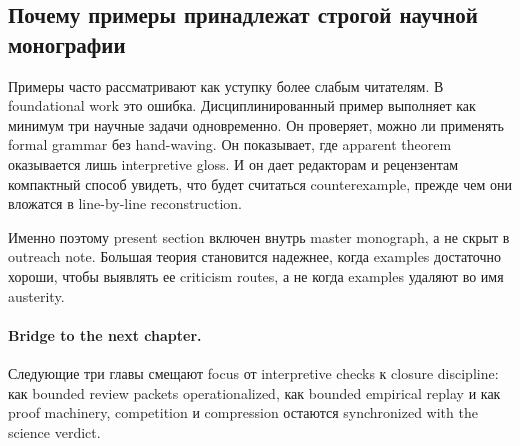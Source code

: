 \subsection{Почему примеры принадлежат строгой научной монографии}

Примеры часто рассматривают как уступку более слабым читателям. В
foundational work это ошибка. Дисциплинированный пример выполняет как
минимум три научные задачи одновременно. Он проверяет, можно ли применять
formal grammar без hand-waving. Он показывает, где apparent theorem
оказывается лишь interpretive gloss. И он дает редакторам и рецензентам
компактный способ увидеть, что будет считаться counterexample, прежде чем
они вложатся в line-by-line reconstruction.

Именно поэтому present section включен внутрь master monograph, а не скрыт в
outreach note. Большая теория становится надежнее, когда examples достаточно
хороши, чтобы выявлять ее criticism routes, а не когда examples удаляют во имя
austerity.

\paragraph{Bridge to the next chapter.}
Следующие три главы смещают focus от interpretive checks к closure discipline:
как bounded review packets operationalized, как bounded empirical replay и как proof
machinery, competition и compression остаются synchronized with the science
verdict.

\clearpage
